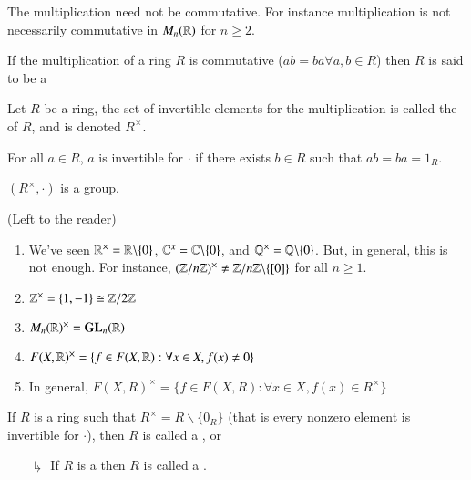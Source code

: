 \documentclass[12pt, a4paper, twoside, openright, titlepage]{book}
\begin{document}
\begin{note*}{}{}
    The multiplication need not be commutative. For instance multiplication is not necessarily commutative in $M_n(\mathbb R)$ for $n \geq 2$.
\end{note*}


\begin{defn}{}{}
    If the multiplication of a ring $R$ is commutative ($ab = ba \forall a,b\in R$) then $R$ is said to be a 
\end{defn}


\begin{defn}{}{}
    Let $R$ be a ring, the set of invertible elements for the multiplication is called the  of $R$, and is denoted $R^{\times}$.
\end{defn}

\begin{rec}{}{}
    For all $a \in R$, $a$ is invertible for $\cdot$ if there exists $b \in R$ such that $ab = ba = 1_R$.
\end{rec}

\begin{xca*}{}{}
    $(R^{\times}, \cdot)$ is a group.
    \begin{proof*}{}{}
        (Left to the reader)
    \end{proof*}
\end{xca*}

\begin{eg}{}{}
    \leavevmode
    \begin{enumerate}
        \item We've seen $\mathbb R^{\times} = \mathbb R\backslash\{0\}$, $\mathbb C^{x} = \mathbb C\backslash\{0\}$, and $\mathbb Q^{\times} = \mathbb Q\backslash\{0\}$. But, in general, this is not enough. For instance, $(\mathbb Z/n\mathbb Z)^{\times} \neq \mathbb Z/n\mathbb Z\backslash\{[0]\}$ for all $n \geq 1$.
        \item $\mathbb Z^{\times} = \{1,-1\}\cong  \mathbb Z/2\mathbb Z$
        \item $M_n(\mathbb R)^{\times} = \mathbf{GL}_n(\mathbb R)$
        \item $F(X,\mathbb R)^{\times} = \{f\in F(X,\mathbb R):\forall x \in X, f(x) \neq 0\}$
        \item In general, $F(X,R)^{\times} = \{f \in F(X,R):\forall x \in X, f(x) \in R^{\times}\}$
    \end{enumerate}
\end{eg}

\begin{defn}{}{}
    If $R$ is a ring such that $R^{\times} = R\backslash\{0_R\}$ (that is every nonzero element is invertible for $\cdot$), then $R$ is called a , or 
    \begin{enumerate}
        \item[$\drsh$] If $R$ is a  then $R$ is called a . 
    \end{enumerate}
\end{defn}
\end{document}

